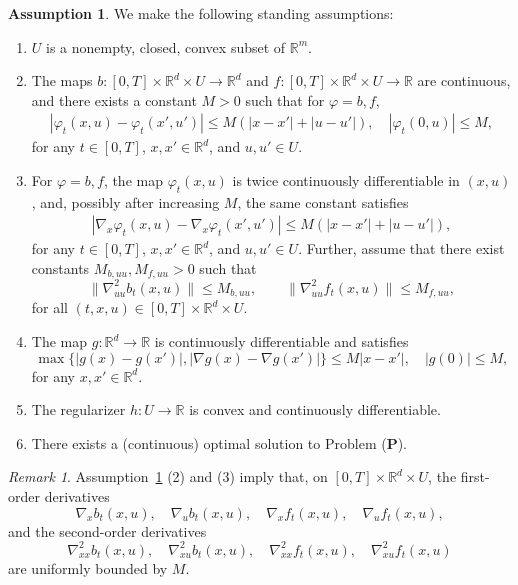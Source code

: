 \documentclass[11pt]{amsart}
\theoremstyle{plain}
\theoremstyle{definition}
\newtheorem{assump}{Assumption}
\theoremstyle{remark}
\newtheorem*{remark}{Remark}
\begin{document}
\begin{assump}\label{asp:main_asp}
    We make the following standing assumptions:
    \begin{enumerate}
        \item $U$ is a nonempty, closed, convex subset of $\mathbb{R}^m$.
        \item The maps $b: [0,T] \times \mathbb{R}^d \times U \to \mathbb{R}^d$ and $f: [0,T] \times \mathbb{R}^d \times U\to \mathbb{R}$ are continuous, and there exists a constant $M > 0$ such that for $\varphi = b, f$,
              \begin{align}
                  |\varphi_t(x, u) - \varphi_t(x', u')| \leq M(|x - x'| + |u - u'|), \quad |\varphi_t(0, u)| \leq M, \nonumber
              \end{align}
              for any $t \in [0,T]$, $x, x' \in \mathbb{R}^d$, and $u, u' \in U$.
        \item For $\varphi = b, f$, the map $\varphi_t(x,u)$ is twice continuously differentiable in $(x,u)$, and, possibly after increasing $M$, the same constant satisfies
              \begin{align}
                  |\nabla_x \varphi_t(x, u) - \nabla_x \varphi_t(x', u')| \leq M(|x - x'| + |u - u'|), \nonumber
              \end{align}
              for any $t \in [0,T]$, $x, x' \in \mathbb{R}^d$, and $u, u' \in U$.
              Further, assume that there exist constants $M_{b,uu}, M_{f,uu} > 0$ such that
\[
\|\nabla^2_{uu} b_t(x,u)\| \le M_{b,uu},
\qquad
\|\nabla^2_{uu} f_t(x,u)\| \le M_{f,uu},
\]
for all $(t,x,u) \in [0,T]\times\mathbb{R}^d\times U$.
        \item The map $g: \mathbb{R}^d \to \mathbb{R}$ is continuously differentiable and satisfies
        \[
        \max\{|g(x) - g(x')|, |\nabla g(x) - \nabla g(x')|\} \leq M|x - x'|, \quad |g(0)| \leq M,
        \]
        for any $x, x' \in \mathbb{R}^d$.
        \item The regularizer $h : U \to \mathbb{R}$ is convex and continuously differentiable.
        \item There exists a (continuous) optimal solution to Problem (\textbf{P}).
    \end{enumerate}
\end{assump}

\begin{remark}
    Assumption~\ref{asp:main_asp} (2) and (3) imply that, on $[0,T]\times\mathbb{R}^d\times U$, the first-order derivatives
    \[
    \nabla_x b_t(x,u),\quad \nabla_u b_t(x,u),\quad
    \nabla_x f_t(x,u),\quad \nabla_u f_t(x,u),
    \]
    and the second-order derivatives
    \[
    \nabla^2_{xx} b_t(x,u),\quad \nabla^2_{xu} b_t(x,u),\quad
    \nabla^2_{xx} f_t(x,u),\quad \nabla^2_{xu} f_t(x,u)
    \]
    are uniformly bounded by $M$. 
\end{remark}
\end{document}
